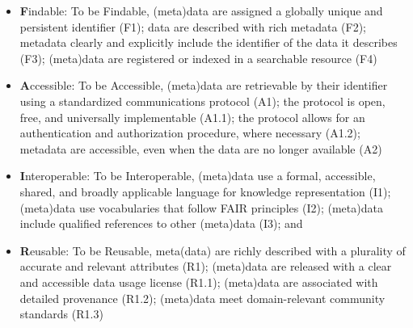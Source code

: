 \begin{itemize}
	\item \textbf{F}indable: To be Findable, (meta)data  are assigned a globally unique and persistent identifier (F1); data are described with rich metadata (F2); metadata clearly and explicitly include the identifier of the data it describes (F3);  (meta)data are registered or indexed in a searchable resource (F4)
	\item \textbf{A}ccessible: To be Accessible, (meta)data are retrievable by their identifier using a standardized communications protocol (A1); the protocol is open, free, and universally implementable (A1.1); the protocol allows for an authentication and authorization procedure, where necessary (A1.2);  metadata are accessible, even when the data are no longer available (A2)
	\item \textbf{I}nteroperable:  To be Interoperable, (meta)data use a formal, accessible, shared, and broadly applicable language for knowledge representation (I1); (meta)data use vocabularies that follow FAIR principles (I2); (meta)data include qualified references to other (meta)data (I3); and
	\item \textbf{R}eusable: To be Reusable, meta(data) are richly described with a plurality of accurate and relevant attributes (R1); (meta)data are released with a clear and accessible data usage license (R1.1); (meta)data are associated with detailed provenance (R1.2); (meta)data meet domain-relevant community standards (R1.3)
\end{itemize}


